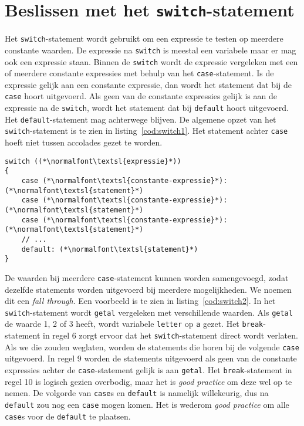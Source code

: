 

\section{Beslissen met het \texttt{switch}-statement}
Het \texttt{switch}-statement wordt gebruikt om een expressie te testen op meerdere constante waarden. De expressie na \texttt{switch} is meestal een variabele maar er mag ook een expressie staan. Binnen de \texttt{switch} wordt de expressie vergeleken met een of meerdere constante expressies met behulp van het \texttt{case}-statement. Is de expressie gelijk aan een constante expressie, dan wordt het statement dat bij de \texttt{case} hoort uitgevoerd. Als geen van de constante expressies gelijk is aan de expressie na de \texttt{switch}, wordt het statement dat bij \texttt{default} hoort uitgevoerd. Het \texttt{default}-statement mag achterwege blijven. De algemene opzet van het \texttt{switch}-statement is te zien in listing~\ref{cod:switch1}. Het statement achter \texttt{case} hoeft niet tussen accolades gezet te worden.

\begin{lstlisting}[caption=Opzet van het \texttt{switch}-statment.,label=cod:switch1]
switch ((*\normalfont\textsl{expressie}*))
{
    case (*\normalfont\textsl{constante-expressie}*): (*\normalfont\textsl{statement}*)
    case (*\normalfont\textsl{constante-expressie}*): (*\normalfont\textsl{statement}*)
    case (*\normalfont\textsl{constante-expressie}*): (*\normalfont\textsl{statement}*)
    // ...
    default: (*\normalfont\textsl{statement}*)
}
\end{lstlisting}

De waarden bij meerdere \texttt{case}-statement kunnen worden samengevoegd, zodat dezelfde statements worden uitgevoerd bij meerdere mogelijkheden. We noemen dit een \textsl{fall through}. Een voorbeeld is te zien in listing~\ref{cod:switch2}. In het \texttt{switch}-statement wordt \texttt{getal} vergeleken met verschillende waarden. Als \texttt{getal} de waarde 1, 2  of 3 heeft, wordt variabele \texttt{letter} op \texttt{\textquotesingle a\textquotesingle} gezet. Het \texttt{break}-statement in regel 6 zorgt ervoor dat het \texttt{switch}-statement direct wordt verlaten. Als we die zouden weglaten, worden de statements die horen bij de volgende \texttt{case} uitgevoerd. In regel 9 worden de statements uitgevoerd als geen van de constante expressies achter de \texttt{case}-statement gelijk is aan \texttt{getal}. Het \texttt{break}-statement in regel 10 is logisch gezien overbodig, maar het is \textsl{good practice} om deze wel op te nemen. De volgorde van \texttt{case}s en \texttt{default} is namelijk willekeurig, dus na \texttt{default} zou nog een \texttt{case} mogen komen. Het is wederom \textsl{good practice} om alle \texttt{case}s voor de \texttt{default} te plaatsen.

